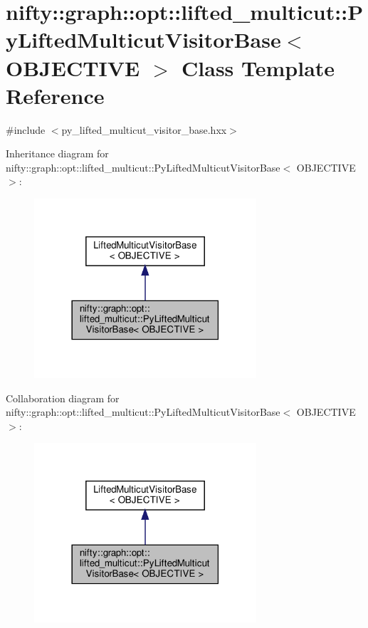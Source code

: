 \hypertarget{classnifty_1_1graph_1_1opt_1_1lifted__multicut_1_1PyLiftedMulticutVisitorBase}{}\section{nifty\+:\+:graph\+:\+:opt\+:\+:lifted\+\_\+multicut\+:\+:Py\+Lifted\+Multicut\+Visitor\+Base$<$ O\+B\+J\+E\+C\+T\+I\+VE $>$ Class Template Reference}
\label{classnifty_1_1graph_1_1opt_1_1lifted__multicut_1_1PyLiftedMulticutVisitorBase}


{\ttfamily \#include $<$py\+\_\+lifted\+\_\+multicut\+\_\+visitor\+\_\+base.\+hxx$>$}



Inheritance diagram for nifty\+:\+:graph\+:\+:opt\+:\+:lifted\+\_\+multicut\+:\+:Py\+Lifted\+Multicut\+Visitor\+Base$<$ O\+B\+J\+E\+C\+T\+I\+VE $>$\+:
\nopagebreak
\begin{figure}[H]
\begin{center}
\leavevmode
\includegraphics[width=234pt]{classnifty_1_1graph_1_1opt_1_1lifted__multicut_1_1PyLiftedMulticutVisitorBase__inherit__graph}
\end{center}
\end{figure}


Collaboration diagram for nifty\+:\+:graph\+:\+:opt\+:\+:lifted\+\_\+multicut\+:\+:Py\+Lifted\+Multicut\+Visitor\+Base$<$ O\+B\+J\+E\+C\+T\+I\+VE $>$\+:
\nopagebreak
\begin{figure}[H]
\begin{center}
\leavevmode
\includegraphics[width=234pt]{classnifty_1_1graph_1_1opt_1_1lifted__multicut_1_1PyLiftedMulticutVisitorBase__coll__graph}
\end{center}
\end{figure}
